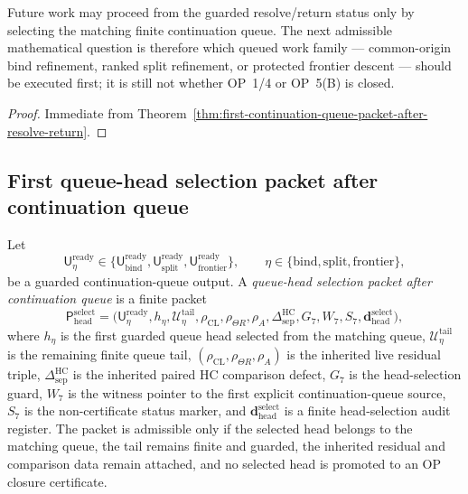 \begin{corollary}
\label{cor:v3340-r22-working-rule}
Future work may proceed from the guarded resolve/return status only by selecting the matching finite continuation queue. The next admissible mathematical question is therefore which queued work family --- common-origin bind refinement, ranked split refinement, or protected frontier descent --- should be executed first; it is still not whether OP~1/4 or OP~5(B) is closed.
\end{corollary}

\begin{proof}
Immediate from Theorem~\ref{thm:first-continuation-queue-packet-after-resolve-return}.
\end{proof}


\subsection{First queue-head selection packet after continuation queue}
\label{subsec:first-queue-head-selection-packet-after-continuation-queue}

\begin{definition}
\label{def:queue-head-selection-packet-after-continuation-queue}
Let
\[
 \mathsf U_{\eta}^{\mathrm{ready}}
 \in
 \{\mathsf U_{\mathrm{bind}}^{\mathrm{ready}},
 \mathsf U_{\mathrm{split}}^{\mathrm{ready}},
 \mathsf U_{\mathrm{frontier}}^{\mathrm{ready}}\},
 \qquad
 \eta\in\{\mathrm{bind},\mathrm{split},\mathrm{frontier}\},
\]
be a guarded continuation-queue output. A \emph{queue-head selection packet after continuation queue} is a finite packet
\[
 \mathsf P_{\mathrm{head}}^{\mathrm{select}}
 =
 \bigl(
 \mathsf U_{\eta}^{\mathrm{ready}},
 h_{\eta},
 \mathcal U_{\eta}^{\mathrm{tail}},
 \rho_{\mathrm{CL}},\rho_{\Theta R},\rho_A,
 \Delta_{\mathrm{sep}}^{\mathrm{HC}},
 G_7,W_7,S_7,
 \mathbf d_{\mathrm{head}}^{\mathrm{select}}
 \bigr),
\]
where \(h_{\eta}\) is the first guarded queue head selected from the matching queue, \(\mathcal U_{\eta}^{\mathrm{tail}}\) is the remaining finite queue tail, \((\rho_{\mathrm{CL}},\rho_{\Theta R},\rho_A)\) is the inherited live residual triple, \(\Delta_{\mathrm{sep}}^{\mathrm{HC}}\) is the inherited paired HC comparison defect, \(G_7\) is the head-selection guard, \(W_7\) is the witness pointer to the first explicit continuation-queue source, \(S_7\) is the non-certificate status marker, and \(\mathbf d_{\mathrm{head}}^{\mathrm{select}}\) is a finite head-selection audit register. The packet is admissible only if the selected head belongs to the matching queue, the tail remains finite and guarded, the inherited residual and comparison data remain attached, and no selected head is promoted to an OP closure certificate.
\end{definition}

